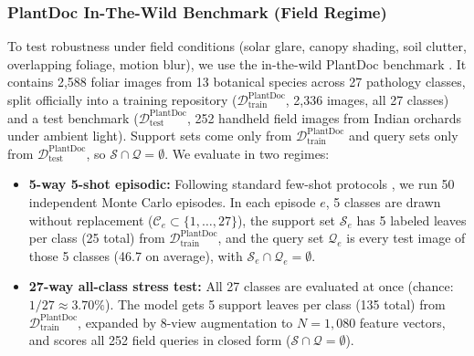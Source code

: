 \documentclass[preprint,12pt]{elsarticle}
\begin{document}
\subsubsection{PlantDoc In-The-Wild Benchmark (Field Regime)}
To test robustness under field conditions (solar glare, canopy shading, soil clutter, overlapping foliage, motion blur), we use the in-the-wild PlantDoc benchmark \cite{singh2020plantdoc}. It contains 2,588 foliar images from 13 botanical species across 27 pathology classes, split officially into a training repository ($\mathcal{D}_{\text{train}}^{\text{PlantDoc}}$, 2,336 images, all 27 classes) and a test benchmark ($\mathcal{D}_{\text{test}}^{\text{PlantDoc}}$, 252 handheld field images from Indian orchards under ambient light). Support sets come only from $\mathcal{D}_{\text{train}}^{\text{PlantDoc}}$ and query sets only from $\mathcal{D}_{\text{test}}^{\text{PlantDoc}}$, so $\mathcal{S} \cap \mathcal{Q} = \emptyset$. We evaluate in two regimes:
\begin{itemize}
    \item \textbf{5-way 5-shot episodic:} Following standard few-shot protocols \cite{snell2017prototypical,zhou2026vsf}, we run 50 independent Monte Carlo episodes. In each episode $e$, 5 classes are drawn without replacement ($\mathcal{C}_e \subset \{1, \dots, 27\}$), the support set $\mathcal{S}_e$ has 5 labeled leaves per class (25 total) from $\mathcal{D}_{\text{train}}^{\text{PlantDoc}}$, and the query set $\mathcal{Q}_e$ is every test image of those 5 classes (46.7 on average), with $\mathcal{S}_e \cap \mathcal{Q}_e = \emptyset$.
    \item \textbf{27-way all-class stress test:} All 27 classes are evaluated at once (chance: $1/27 \approx 3.70\%$). The model gets 5 support leaves per class (135 total) from $\mathcal{D}_{\text{train}}^{\text{PlantDoc}}$, expanded by 8-view augmentation to $N = 1{,}080$ feature vectors, and scores all 252 field queries in closed form ($\mathcal{S} \cap \mathcal{Q} = \emptyset$).
\end{itemize}
\end{document}
